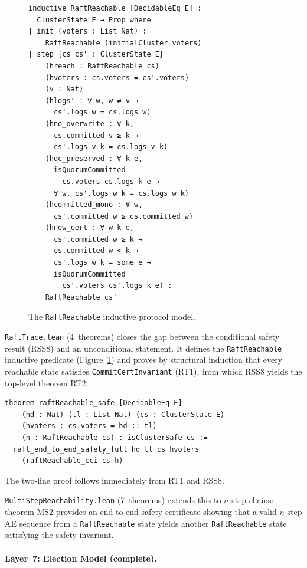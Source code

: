 \documentclass[sigconf,10pt]{acmart}
\begin{document}
\begin{figure}[h]
\begin{lstlisting}[language=Lean4]
inductive RaftReachable [DecidableEq E] :
  ClusterState E → Prop where
| init (voters : List Nat) :
    RaftReachable (initialCluster voters)
| step {cs cs' : ClusterState E}
    (hreach : RaftReachable cs)
    (hvoters : cs.voters = cs'.voters)
    (v : Nat)
    (hlogs' : ∀ w, w ≠ v →
      cs'.logs w = cs.logs w)
    (hno_overwrite : ∀ k,
      cs.committed v ≥ k →
      cs'.logs v k = cs.logs v k)
    (hqc_preserved : ∀ k e,
      isQuorumCommitted
        cs.voters cs.logs k e →
      ∀ w, cs'.logs w k = cs.logs w k)
    (hcommitted_mono : ∀ w,
      cs'.committed w ≥ cs.committed w)
    (hnew_cert : ∀ w k e,
      cs'.committed w ≥ k →
      cs.committed w < k →
      cs'.logs w k = some e →
      isQuorumCommitted
        cs'.voters cs'.logs k e) :
    RaftReachable cs'
\end{lstlisting}
\caption{The \texttt{RaftReachable} inductive protocol model.}
\label{fig:rr}
\end{figure}

\texttt{RaftTrace.lean} (4~theorems) closes the gap between the conditional
safety result (RSS8) and an unconditional statement.  It defines the
\texttt{RaftReachable} inductive predicate (Figure~\ref{fig:rr}) and
proves by structural induction that every reachable state satisfies
\texttt{CommitCertInvariant} (RT1), from which RSS8 yields the top-level
theorem RT2:

\begin{lstlisting}[language=Lean4]
theorem raftReachable_safe [DecidableEq E]
    (hd : Nat) (tl : List Nat) (cs : ClusterState E)
    (hvoters : cs.voters = hd :: tl)
    (h : RaftReachable cs) : isClusterSafe cs :=
  raft_end_to_end_safety_full hd tl cs hvoters
    (raftReachable_cci cs h)
\end{lstlisting}

The two-line proof follows immediately from RT1 and RSS8.

\texttt{MultiStepReachability.lean} (7~theorems) extends this to $n$-step
chains: theorem MS2 provides an end-to-end safety certificate showing that
a valid $n$-step AE sequence from a \texttt{RaftReachable} state yields
another \texttt{RaftReachable} state satisfying the safety invariant.

\paragraph{Layer~7: Election Model (complete).}
\end{document}
